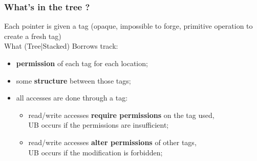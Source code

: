 \begin{frame}
    \frametitle{What's in the tree ?}
    Each pointer is given a tag (opaque, impossible to forge, primitive operation to create a fresh tag)
    ~\\
    What (Tree|Stacked) Borrows track:
    \begin{itemize}
        \item \textbf{permission} of each tag for each location;
        \item some \textbf{structure} between those tags;
        \item all accesses are done through a tag:
            \begin{itemize}
                \item read/write accesses \textbf{require permissions} on the tag used,\\
                    UB occurs if the permissions are insufficient;
                \item read/write accesses \textbf{alter permissions} of other tags,\\
                    UB occurs if the modification is forbidden;
            \end{itemize}
    \end{itemize}
\end{frame}


